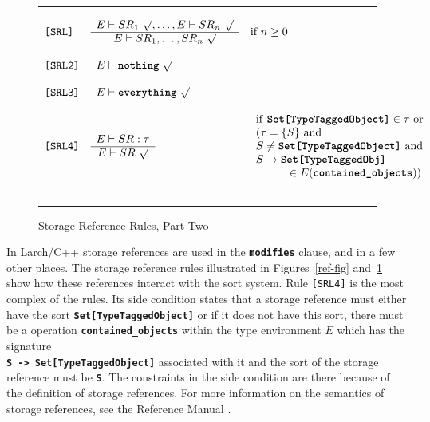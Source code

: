 \documentclass[12pt]{article} %
\newcommand{\reserved}[1]{\textbf{\texttt{#1}}} %
\newcommand{\RULELAB}[1]{\texttt{#1}}
\newcommand{\UNSPACEFORBOX}{\vspace{-2ex}}
\newcommand{\HLINE}{\UNSPACEFORBOX%
\begin{flushleft}\rule{\textwidth}{0.01in}\end{flushleft}%
\UNSPACEFORBOX}
\newenvironment{BFIGURE}{

\begin{figure}
\small
\HLINE
}{
\HLINE
\normalsize
\end{figure}
}
\begin{document}
\begin{BFIGURE}
\begin{displaymath}
\begin{array}{lll}
\RULELAB{[SRL]} &
\begin{array}{c}
E \vdash SR_1~\surd,\dots,E\vdash SR_n~\surd\\
\hline
E \vdash SR_1,\dots,SR_n~\surd
\end{array}
&
\mbox{if $n \geq 0$}
\\
~\\
\RULELAB{[SRL2]} &
\begin{array}{c}
E \vdash \mbox{\reserved{nothing}}~\surd
\end{array}
\\
~\\
\RULELAB{[SRL3]} &
\begin{array}{c}
E \vdash \mbox{\reserved{everything}}~\surd
\end{array}
\\
~\\
\RULELAB{[SRL4]} &
\begin{array}{c}
E \vdash SR:\tau \\
\hline
E \vdash SR~\surd
\end{array}
&
\begin{array}{l}
\mbox{if \reserved{Set[TypeTaggedObject]}} \in \tau \mbox{ or } \\
(\tau = \{S\} \mbox{ and}  \\
S \not= \mbox{\reserved{Set[TypeTaggedObject]}} \mbox{ and} \\
S \rightarrow \mbox{\reserved{Set[TypeTaggedObj]}} \\
~~~~~~~~~\in E(\mbox{\reserved{contained\_objects}}))
\end{array}
\\
~\\
\end{array}
\end{displaymath}
\caption{Storage Reference Rules, Part Two}
\label{ref-fig2}
\end{BFIGURE}

In Larch/C++ storage references are used in the \reserved{modifies}
clause, and in a few other places. The storage reference rules
illustrated in Figures~\ref{ref-fig} and~\ref{ref-fig2} show how these
references interact with the sort system. Rule \RULELAB{[SRL4]} is the
most complex of the rules. Its side condition states that a storage
reference must either have the sort \reserved{Set[TypeTaggedObject]}
or if it does not have this sort, there must be a operation
\reserved{contained\_objects} within the type environment $E$ which
has the signature \\ \reserved{S -> Set[TypeTaggedObject]} associated
with it and the sort of the storage reference must be \reserved{S}. The
constraints in the side condition are there because of the definition
of storage references. For more information on the
semantics of storage references, see the
Reference Manual \cite[Section 6.2.3.3 and following]{Leavens96c}.
\end{document}
